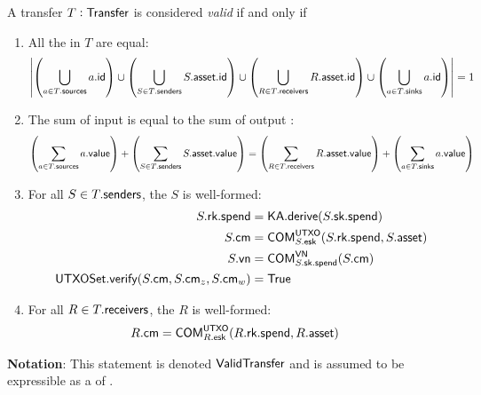 \begin{definition}\label{def:transfer-validity-statement}
    A transfer $T : {\textsf{Transfer}}$ is considered \emph{valid} if and only if
    \begin{enumerate}
        \item All the  in $T$ are equal:
            \[
                \left|
                    \left(\bigcup_{a \in T.{\textsf{sources}}} a.{\textsf{id}} \right)
                    \cup
                    \left(\bigcup_{S \in T.{\textsf{senders}}} S.{\textsf{asset}}.{\textsf{id}} \right)
                    \cup
                    \left(\bigcup_{R \in T.{\textsf{receivers}}} R.{\textsf{asset}}.{\textsf{id}} \right)
                    \cup
                    \left(\bigcup_{a \in T.{\textsf{sinks}}} a.{\textsf{id}} \right)
                \right| = 1
            \]
        \item The sum of input  is equal to the sum of output :
            \[
                \left(\sum_{a \in T.{\textsf{sources}}} a.{\textsf{value}}\right)
                +
                \left(\sum_{S \in T.{\textsf{senders}}} S.{\textsf{asset}}.{\textsf{value}}\right)
                =
                \left(\sum_{R \in T.{\textsf{receivers}}} R.{\textsf{asset}}.{\textsf{value}}\right)
                +
                \left(\sum_{a \in T.{\textsf{sinks}}} a.{\textsf{value}}\right)
            \]
        \item For all $S \in T.{\textsf{senders}}$, the \Sender{} $S$ is well-formed:
            \begin{align*}
                S.{\textsf{rk}}.{\textsf{spend}}                              &= {\textsf{KA}}.{\textsf{derive}}(S.{\textsf{sk}}.{\textsf{spend}}) \\
                S.{\textsf{cm}}                                     &= {\textsf{COM}}^{{\textsf{UTXO}}}_{S.{\textsf{esk}}}(S.{\textsf{rk}}.{\textsf{spend}}, S.{\textsf{asset}}) \\
                S.{\textsf{vn}}                                     &= {\textsf{COM}}^{{\textsf{VN}}}_{S.{\textsf{sk}}.{\textsf{spend}}}(S.{\textsf{cm}}) \\
                {\textsf{UTXOSet}}.{\textsf{verify}}(S.{\textsf{cm}}, S.{\textsf{cm}}_z, S.{\textsf{cm}}_w) &= {\textsf{True}}
            \end{align*}
        \item For all $R \in T.{\textsf{receivers}}$, the \Receiver{} $R$ is well-formed:
            \begin{align*}
                R.{\textsf{cm}} &= {\textsf{COM}}^{{\textsf{UTXO}}}_{R.{\textsf{esk}}}(R.{\textsf{rk}}.{\textsf{spend}}, R.{\textsf{asset}})
            \end{align*}
    \end{enumerate}
    \textbf{Notation}: This statement is denoted ${\textsf{ValidTransfer}}$ and is assumed to be expressible as a \Statement{} of \NIZK{}.
\end{definition}


